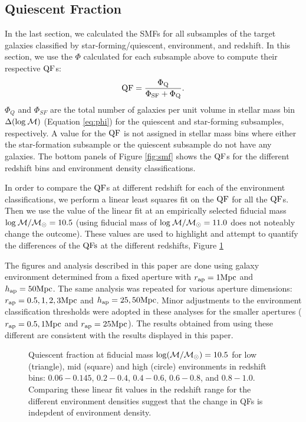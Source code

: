 \documentclass{emulateapj}
\begin{document}
\subsection{Quiescent Fraction} \label{sec:qf_const}
In the last section, we calculated the SMFs for all subsamples of the target galaxies classified by star-forming/quiescent, environment, and redshift. 
In this section, we use the $\Phi$ calculated for each subsample above to compute their respective $\rm{QF}$s: 
\begin{equation}
\rm{QF} = \frac{\Phi_{Q}}{\Phi_{SF}+\Phi_{Q}}.
\end{equation}
$\Phi_{Q}$ and $\Phi_{SF}$ are the total number of galaxies per unit volume in stellar mass bin $\Delta(\rm{log} \: \mathcal{M})$ (Equation \ref{eq:phi}) for the quiescent and star-forming subsamples, respectively.
A value for the $\rm{QF}$ is not assigned in stellar mass bins where either the star-formation subsample or the quiescent subsample do not have any galaxies. 
The bottom panels of Figure \ref{fig:smf} shows the $\rm{QF}$s for the different redshift bins and environment density classifications.

In order to compare the $\rm{QF}$s at different redshift for each of the environment classifications, we perform a linear least squares fit on the $\rm{QF}$ for all the $\rm{QF}$s. 
Then we use the value of the linear fit at an empirically selected fiducial mass $\rm{log} \: \mathcal{M}/\mathcal{M}_{\odot} = 10.5$ (using fiducial mass of $\rm{log} \: \mathcal{M}/
\mathcal{M}_\odot = 11.0$ does not noteably change the outcome).
These values are used to highlight and attempt to quantify the differences of the $\rm{QFs}$ at the different redshifts, Figure \ref{fig:qf}

The figures and analysis described in this paper are done using galaxy environment determined from a fixed aperture with $r_{\rm{ap}} = 1 \rm{Mpc}$ and $h_{\rm{ap}} = 50 \rm{Mpc}$.
The same analysis was repeated for various aperture dimensions: $r_{\rm{ap}} = 0.5, 1, 2, 3 \rm{Mpc}$ and $h_{\rm{ap}} = 25, 50 \rm{Mpc}$. 
Minor adjustments to the environment classification thresholds were adopted in these analyses for the smaller apertures ($r_{\rm{ap}} = 0.5, 1 \rm{Mpc}$ and $r_{\rm{ap}} = 25 \rm{Mpc}$).
The results obtained from using these different are consistent with the results displayed in this paper. 
\begin{figure}
    \begin{center}
        \leavevmode
        \label{fig:qf}
        \caption{Quiescent fraction at fiducial mass $\rm{log} (\mathcal{M}/\mathcal{M}_{\odot}) = 10.5$ for low (triangle), mid (square) and high (circle) environments in redshift bins: $0.06-0.145$, $0.2-0.4$, $0.4-0.6$, $0.6-0.8$, and $0.8-1.0$. Comparing these linear fit values in the redshift range for the different environment densities suggest that the change in QFs is indepdent of environment density.}
    \end{center}
\end{figure}
\end{document}
